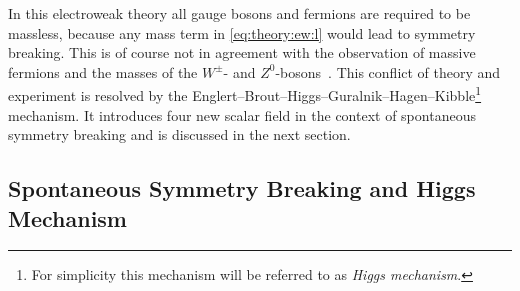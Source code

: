 In this electroweak theory all gauge bosons and fermions are required to be massless, because any mass term in \cref{eq:theory:ew:l}
would lead to symmetry breaking.
This is of course not in agreement with the observation of massive fermions and the masses of the $W^\pm$- and $Z^0$-bosons~\cite{PDG}.
This conflict of theory and experiment is resolved by the Englert--Brout--Higgs--Guralnik--Hagen--Kibble\footnote{For simplicity this mechanism will be referred to as \emph{Higgs mechanism}.} mechanism.
It introduces four new scalar field in the context of spontaneous symmetry breaking and is discussed in the next section.

\subsection{Spontaneous Symmetry Breaking and Higgs Mechanism}\label{sub:theory:sm:higgsmechanism}

